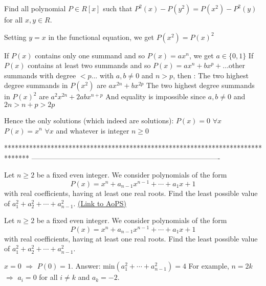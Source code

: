 \begin{solution}
	\begin{tcolorbox}Find  all  polynomial $P{\in}R[x]$ such that  $P^2(x)-P(y^2)=P(x^2)-P^2(y)$  for all $x,y{\in}R$.\end{tcolorbox}
Setting $y=x$ in the functional equation, we get $P(x^2)=P(x)^2$

If $P(x)$ contains only one summand and so $P(x)=ax^n$, we get $a\in\{0,1\}$
If $P(x)$ contains at least two summands and so $P(x)=ax^n+bx^p+...$other summands with degree $<p...$ with $a,b\ne 0$ and $n>p$, then :
The two highest degree summands in $P(x^2)$ are $ax^{2n}+bx^{2p}$
The two highest degree summands in $P(x)^2$ are $a^2x^{2n}+2abx^{n+p}$
And equality is impossible since $a,b\ne 0$ and $2n>n+p>2p$

Hence the only solutions (which indeed are solutions):
$P(x)=0$ $\forall x$
$P(x)=x^n$ $\forall x$ and whatever is integer $n\ge 0$
\end{solution}
*******************************************************************************
-------------------------------------------------------------------------------

\begin{problem}
	Let $n \ge 2$ be a fixed even integer. We consider polynomials of the form 
\[P(x) = x^n + a_{n-1}x^{n-1} + \cdots + a_1x + 1\]
with real coefficients, having at least one real roots. Find the least possible value of $a^2_1 + a^2_2 + \cdots + a^2_{n-1}$.
	\flushright \href{https://artofproblemsolving.com/community/c6h531848}{(Link to AoPS)}
\end{problem}



\begin{solution}
	\begin{tcolorbox}Let $n \ge 2$ be a fixed even integer. We consider polynomials of the form 
\[P(x) = x^n + a_{n-1}x^{n-1} + \cdots + a_1x + 1\]
with real coefficients, having at least one real roots. Find the least possible value of $a^2_1 + a^2_2 + \cdots + a^2_{n-1}$.\end{tcolorbox}
$x=0$ $ \Rightarrow $ $ P(0)=1$.
Answer: min$ (a^2_1+ \cdots +a^2_{n-1})=4 $ 
For example, $n=2k$ $ \Rightarrow $  $a_i=0$ for all $i \not= k$ and $a_k=-2$.
\end{solution}



